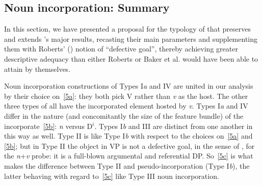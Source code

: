 \documentclass[output=paper]{langsci/langscibook}
\newcommand{\posscite}[1]{\citeauthor{#1}'s \citeyearpar{#1}}
\begin{document}
\begin{refcontext}
\subsection{Noun incorporation: Summary}
In this section, we have presented a proposal for the typology of  that preserves
and extends \posscite{bakeretal05} major results, recasting their main parameters and supplementing
them with Roberts' (\citeyear{Roberts2010}) notion of \enquote{defective goal}, thereby achieving greater descriptive adequacy
than either Roberts or Baker et al. would have been able to attain by themselves.

Noun incorporation constructions of Types I\emph{a} and IV are united in our
analysis by their choice on~\eqref{5a}: they both pick V rather than \emph{v} as
the host. The other three types of  all have the incorporated
element hosted by \emph{v}. Types I\emph{a} and IV differ in the nature (and
concomitantly the size of the feature bundle) of the incorporate~\eqref{5b}:
\emph{n} versus D$^i$. Types I\emph{b} and III are distinct from one another in
this way as well. Type II is like Type I\emph{b} with respect to the choices
on~\eqref{5a} and \eqref{5b}; but in Type II the object in VP is not a defective
goal, in the sense of \cite{Roberts2010}, for the \emph{n}+\emph{v} probe: it is
a full-blown argumental and referential DP. So~\eqref{5c} is what makes the
difference between Type II  and pseudo-incorporation (Type
I\emph{b}), the latter behaving with regard to~\eqref{5c} like Type III noun
incorporation.


\end{refcontext}
\end{document}
